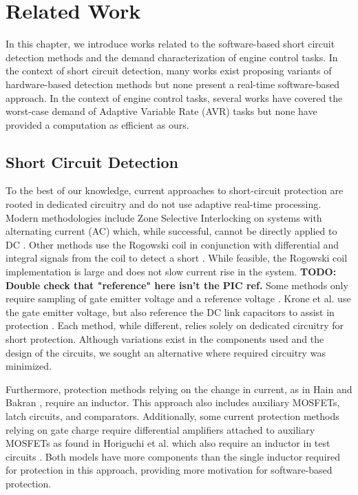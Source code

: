 \section{Related Work}   \label{chap:relatedWork}

In this chapter, we introduce works related to the software-based short circuit detection methods and the demand characterization of engine control tasks.
In the context of short circuit detection, many works exist proposing variants of hardware-based detection methods but none present a real-time software-based approach.
In the context of engine control tasks, several works have covered the worst-case demand of Adaptive Variable Rate (AVR) tasks but none have provided a computation as efficient as ours.

\subsection{Short Circuit Detection} \label{subsec:scd-relatedWork}

To the best of our knowledge, current approaches to short-circuit protection are rooted in dedicated circuitry and do not use adaptive real-time processing.
Modern methodologies include Zone Selective Interlocking on systems with alternating current (AC) which, while successful, cannot be directly applied to DC \cite{du_new_2014}.
Other methods use the Rogowski coil in conjunction with differential and integral signals from the coil to detect a short \cite{wang_new_2011}.
While feasible, the Rogowski coil implementation is large and does not slow current rise in the system.
\textbf{TODO: Double check that "reference" here isn't the PIC ref.} Some methods only require sampling of gate emitter voltage and a reference voltage \cite{horiguchi_short_2014}.
Krone et al. use the gate emitter voltage, but also reference the DC link capacitors to assist in protection \cite{krone_fast_2015}.
Each method, while different, relies solely on dedicated circuitry for short protection.
Although variations exist in the components used and the design of the circuits, we sought an alternative where required circuitry was minimized.

Furthermore, protection methods relying on the change in current, as in Hain and Bakran \cite{hain_new_2016}, require an inductor.
This approach also includes auxiliary MOSFETs, latch circuits, and comparators.
Additionally, some current protection methods relying on gate charge require differential amplifiers attached to auxiliary MOSFETs as found in Horiguchi et al. which also require an inductor in test circuits \cite{horiguchi_high-speed_2015}.
Both models have more components than the single inductor required for protection in this approach, providing more motivation for software-based protection.

